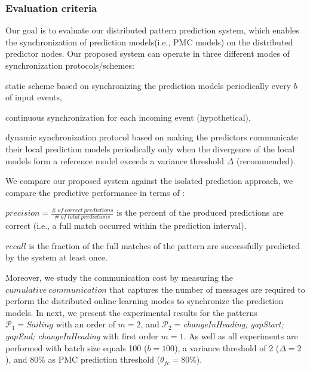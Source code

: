 \subsubsection*{Evaluation criteria} Our goal is to evaluate our distributed pattern prediction system, which enables the synchronization of prediction models(i.e., PMC models) on the distributed predictor nodes. Our proposed system can operate in three different modes of synchronization protocols/schemes: \begin{enumerate*}[label=(\roman*)] 
	\item static scheme based on synchronizing the prediction models periodically every $b$ of input events, 
\item continuous synchronization for each incoming event (hypothetical), 
\item dynamic synchronization protocol based on making the predictors communicate their local prediction models periodically only when the divergence of the local models form a reference model exceeds a variance threshold $\Delta$ (recommended).
 	   
\end{enumerate*}
We compare our proposed system against the isolated prediction approach, we compare the predictive performance in terms of :
\begin{enumerate*}[label=(\roman*)]
	
\item  $\mathit{precision = \frac{\#\ of\ correct\ predictions}{\#\ of\ total\ predictions}}$ is the percent of the produced predictions are correct (i.e., a full match occurred within the prediction interval).   

\item $\mathit{recall}$ is the fraction of the full matches of the pattern are successfully predicted by the system at least once. 

\end{enumerate*} 
\par Moreover, we study the communication cost by measuring the $\mathit{cumulative\ communication}$ that captures the number of messages are required to perform the distributed online learning modes to synchronize the prediction models. In next, we present the experimental results for the patterns  $\mathcal{P}_1=Sailing$ with an order of $m=2$, and   $\mathcal{P}_2=$\textit{changeInHeading; gapStart; gapEnd; changeInHeading} with first order $m=1$. As well as all experiments are performed with batch size equals 100  ($b=100$), a variance threshold of 2 ($\Delta=2$), and $80\%$ as PMC prediction threshold ($\theta_{fc}=80\%$).

